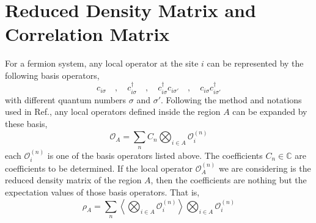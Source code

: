 \documentclass[12font]{article}
\theoremstyle{definition}
\numberwithin{equation}{section}
\newcommand{\angleLr}[1]{\left\langle #1 \right\rangle}
\begin{document}
\section{Reduced Density Matrix and Correlation Matrix}
For a fermion system, any local operator at the site $i$ can be represented by the following basis operators,
\[
c_{i\sigma} \quad,\quad c_{i\sigma}^\dagger \quad,\quad c^\dagger_{i\sigma}c_{i\sigma'} \quad,\quad c_{i\sigma}c^\dagger_{i\sigma'}
\]
with different quantum numbers $\sigma$ and $\sigma'$. Following the method and notations used in Ref.\cite{toeplitz}, any local operators defined inside the region $A$ can be expanded by these basis,
\[
\mathcal{O}_A = \sum_{n}C_n\bigotimes_{i\in A}\mathcal{O}_i^{(n)}
\]
each $\mathcal{O}_i^{(n)}$ is one of the basis operators listed above. The coefficients $C_n\in\mathbb{C}$ are coefficients to be determined. If the local operator $\mathcal{O}_A^{(n)}$ we are considering is the reduced density matrix of the region $A$, then the coefficients are nothing but the expectation values of those basis operators. That is,
\begin{equation}\label{rho_A-raw-form.e}
  \rho_A = \sum_{n}\angleLr{\bigotimes_{i\in A}\mathcal{O}_i^{(n)}}\bigotimes_{i\in A}\mathcal{O}_i^{(n)}
\end{equation}
\end{document}
